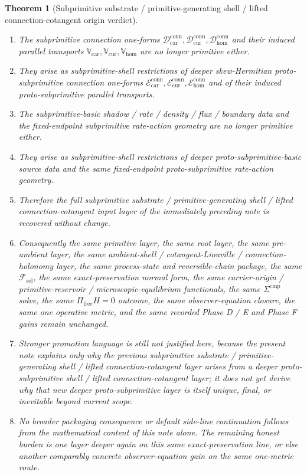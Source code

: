 \documentclass[11pt]{article}
\newcommand{\StemFunctional}{\mathscr F_{\mathrm{sel}}}
\newcommand{\Car}{\mathrm{car}}
\newcommand{\Cur}{\mathrm{cur}}
\newcommand{\Hom}{\mathrm{hom}}
\newcommand{\SubprimConnectionForm}[1]{\mathcal D_{#1}^{\mathrm{conn}}}
\newcommand{\SubprimTransport}[1]{\mathbb V_{#1}}
\newcommand{\ProtoSubprimConnectionForm}[1]{\mathcal E_{#1}^{\mathrm{conn}}}
\newtheorem{theorem}{Theorem}
\begin{document}
\begin{theorem}[Subprimitive substrate / primitive-generating shell / lifted connection-cotangent origin verdict]
\begin{enumerate}
    \item The subprimitive connection one-forms \(\SubprimConnectionForm{\Car},\SubprimConnectionForm{\Cur},\SubprimConnectionForm{\Hom}\) and their induced parallel transports \(\SubprimTransport{\Car},\SubprimTransport{\Cur},\SubprimTransport{\Hom}\) are no longer primitive either.
    \item They arise as subprimitive-shell restrictions of deeper skew-Hermitian proto-subprimitive connection one-forms \(\ProtoSubprimConnectionForm{\Car},\ProtoSubprimConnectionForm{\Cur},\ProtoSubprimConnectionForm{\Hom}\) and of their induced proto-subprimitive parallel transports.
    \item The subprimitive-basic shadow / rate / density / flux / boundary data and the fixed-endpoint subprimitive rate-action geometry are no longer primitive either.
    \item They arise as subprimitive-shell restrictions of deeper proto-subprimitive-basic source data and the same fixed-endpoint proto-subprimitive rate-action geometry.
    \item Therefore the full subprimitive substrate / primitive-generating shell / lifted connection-cotangent input layer of the immediately preceding note is recovered without change.
    \item Consequently the same primitive layer, the same root layer, the same pre-ambient layer, the same ambient-shell / cotangent-Liouville / connection-holonomy layer, the same process-state and reversible-chain package, the same \(\StemFunctional\), the same exact-preservation normal form, the same carrier-origin / primitive-reservoir / microscopic-equilibrium functionals, the same \(\Sigma^{\mathrm{cmp}}\) solve, the same \(\Pi_{\mathrm{free}}H=0\) outcome, the same observer-equation closure, the same one operative metric, and the same recorded Phase D / E and Phase F gains remain unchanged.
    \item Stronger promotion language is still not justified here, because the present note explains only why the previous subprimitive substrate / primitive-generating shell / lifted connection-cotangent layer arises from a deeper proto-subprimitive shell / lifted connection-cotangent layer; it does not yet derive why that new deeper proto-subprimitive layer is itself unique, final, or inevitable beyond current scope.
    \item No broader packaging consequence or default side-line continuation follows from the mathematical content of this note alone. The remaining honest burden is one layer deeper again on this same exact-preservation line, or else another comparably concrete observer-equation gain on the same one-metric route.
\end{enumerate}
\end{theorem}
\end{document}
